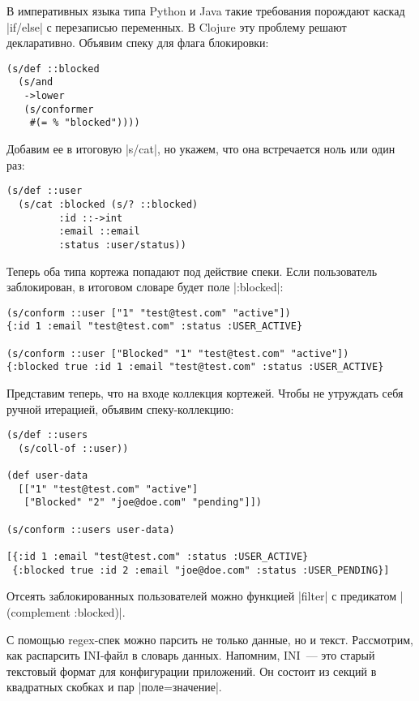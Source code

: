 В императивных языка типа Python и Java такие требования порождают каскад
\spverb|if/else| с перезаписью переменных. В Clojure эту проблему решают
декларативно. Объявим спеку для флага блокировки:

\begin{verbatim}
(s/def ::blocked
  (s/and
   ->lower
   (s/conformer
    #(= % "blocked"))))
\end{verbatim}

Добавим ее в итоговую \spverb|s/cat|, но укажем, что она встречается ноль или один раз:

\begin{verbatim}
(s/def ::user
  (s/cat :blocked (s/? ::blocked)
         :id ::->int
         :email ::email
         :status :user/status))
\end{verbatim}

Теперь оба типа кортежа попадают под действие спеки. Если пользователь
заблокирован, в итоговом словаре будет поле \spverb|:blocked|:

\begin{verbatim}
(s/conform ::user ["1" "test@test.com" "active"])
{:id 1 :email "test@test.com" :status :USER_ACTIVE}

(s/conform ::user ["Blocked" "1" "test@test.com" "active"])
{:blocked true :id 1 :email "test@test.com" :status :USER_ACTIVE}
\end{verbatim}

Представим теперь, что на входе коллекция кортежей. Чтобы не утруждать себя
ручной итерацией, объявим спеку-коллекцию:

\begin{verbatim}
(s/def ::users
  (s/coll-of ::user))

(def user-data
  [["1" "test@test.com" "active"]
   ["Blocked" "2" "joe@doe.com" "pending"]])

(s/conform ::users user-data)

[{:id 1 :email "test@test.com" :status :USER_ACTIVE}
 {:blocked true :id 2 :email "joe@doe.com" :status :USER_PENDING}]
\end{verbatim}

Отсеять заблокированных пользователей можно функцией \spverb|filter| с предикатом
\spverb|(complement :blocked)|.

С помощью regex-спек можно парсить не только данные, но и текст. Рассмотрим, как
распарсить INI-файл в словарь данных. Напомним, INI~--- это старый текстовый
формат для конфигурации приложений. Он состоит из секций в квадратных скобках и
пар \spverb|поле=значение|.

